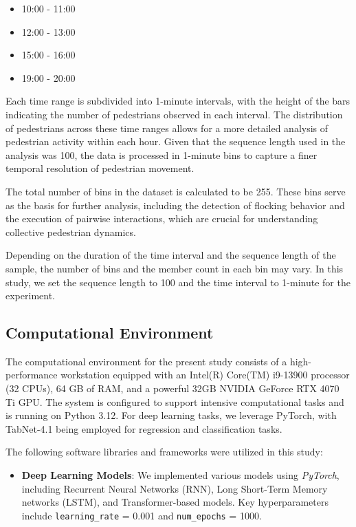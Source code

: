 \documentclass{article}
\begin{document}
\begin{itemize} \item 10:00 - 11:00 \item 12:00 - 13:00 \item 15:00 - 16:00 \item 19:00 - 20:00 \end{itemize}

Each time range is subdivided into 1-minute intervals, with the height of the bars indicating the number of pedestrians observed in each interval. The distribution of pedestrians across these time ranges allows for a more detailed analysis of pedestrian activity within each hour. Given that the sequence length used in the analysis was 100, the data is processed in 1-minute bins to capture a finer temporal resolution of pedestrian movement.

The total number of bins in the dataset is calculated to be 255. These bins serve as the basis for further analysis, including the detection of flocking behavior and the execution of pairwise interactions, which are crucial for understanding collective pedestrian dynamics. 

Depending on the duration of the time interval and the sequence length of the sample, the number of bins and the member count in each bin may vary. In this study, we set the sequence length to 100 and the time interval to 1-minute for the experiment.

\subsection{Computational Environment}

The computational environment for the present study consists of a high-performance workstation equipped with an Intel(R) Core(TM) i9-13900 processor (32 CPUs), 64 GB of RAM, and a powerful 32GB NVIDIA GeForce RTX 4070 Ti GPU. The system is configured to support intensive computational tasks and is running on Python 3.12. For deep learning tasks, we leverage PyTorch, with TabNet-4.1 being employed for regression and classification tasks.

The following software libraries and frameworks were utilized in this study:

\begin{itemize}
    \item \textbf{Deep Learning Models}: We implemented various models using \textit{PyTorch}, including Recurrent Neural Networks (RNN), Long Short-Term Memory networks (LSTM), and Transformer-based models. Key hyperparameters include \texttt{learning\_rate} = 0.001 and \texttt{num\_epochs} = 1000.
\end{itemize}
\end{document}
